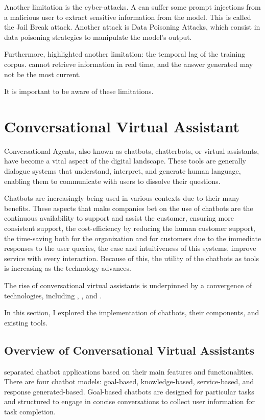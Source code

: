 Another limitation is the cyber-attacks. A {\llm} can suffer some prompt injections from a malicious user to extract sensitive information from the model. This is called the Jail Break attack. Another attack is Data Poisoning Attacks, which consist in data poisoning strategies to manipulate the model's output.

Furthermore, \citet{liu_prompting_nodate} highlighted another limitation: the temporal lag of the training corpus. {\llm} cannot retrieve information in real time, and the answer generated may not be the most current.

It is important to be aware of these limitations.


\section{Conversational Virtual Assistant}

Conversational Agents, also known as chatbots, chatterbots, or virtual assistants, have become a vital aspect of the digital landscape. These tools are generally dialogue systems that understand, interpret, and generate human language, enabling them to communicate with users to dissolve their questions.

Chatbots are increasingly being used in various contexts due to their many benefits. 
These aspects that make companies bet on the use of chatbots are the continuous availability to support and assist the customer, ensuring more consistent support, the cost-efficiency by reducing the human customer support, the time-saving both for the organization and for customers due to the immediate responses to the user queries, the ease and intuitiveness of this systems, improve service with every interaction. Because of this, the utility of the chatbots as tools is increasing as the technology advances. 

The rise of conversational virtual assistants is underpinned by a convergence of technologies, including {\nlp}, {\mlearning}, and {\ai}.

In this section, I explored the implementation of chatbots, their components, and existing tools.


\subsection{Overview of Conversational Virtual Assistants}

\citet{nuruzzaman_survey_2018} separated chatbot applications based on their main features and functionalities. There are four chatbot models: goal-based, knowledge-based, service-based, and response generated-based. Goal-based chatbots are designed for particular tasks and structured to engage in concise conversations to collect user information for task completion.

